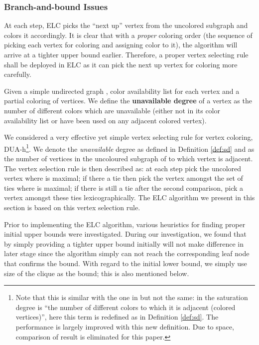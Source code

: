 \documentclass[10pt]{article}
\begin{document}
\subsubsection{Branch-and-bound Issues}

At each step, ELC picks the ``next up'' vertex from the uncolored
subgraph and colors it accordingly.  It is clear that with a \textit{proper}
coloring order (the sequence of picking each vertex for coloring and assigning color to it), the algorithm will arrive at a tighter upper bound earlier.
Therefore, a proper vertex selecting rule shall be deployed in ELC as it can pick the
next up vertex for coloring more carefully.

\begin{mydef}\label{def:sd}
Given a simple undirected graph , color availability list  for each vertex  and  a partial coloring of  vertices. We define the \textbf{unavailable degree} of a vertex as the number of different colors which are unavailable (either not in its color availability list or have been used on any adjacent colored vertex).
\end{mydef}

We considered a very effective yet simple vertex selecting rule for vertex
coloring, DUA-h\footnote{Note that this is similar with the one in \cite{Bre79} but not 
the same: in \cite{Bre79} the saturation degree is ``the number of different 
colors to which it is adjacent (colored vertices)'', here this term is redefined 
as in Definition \ref{def:sd}. The performance is largely improved with this
new definition. Due to space, comparison of result is eliminated for this paper.}.  We
denote  the \emph{unavailable} degree as defined in Definition 
\ref{def:sd} and  as the number of vertices in the uncoloured 
subgraph of  to which vertex  is adjacent. The vertex selection rule is then described as:  at each step pick the uncolored vertex  where  is maximal; 
if there a tie then pick the vertex amongst the set of ties where  is maximal;
if there is still a tie after the second comparison, 
pick a vertex  amongst these ties lexicographically.
The ELC algorithm we present in this section is based on this vertex selection rule.

Prior to implementing the
ELC algorithm, various heuristics for finding proper initial upper
bounds were investigated. During our investigation, we found that by
simply providing a tighter upper bound initially will not make difference 
in later stage since the algorithm simply can not reach the corresponding
leaf node that confirms the bound. With regard to the initial lower bound, we simply
use size of the clique as the bound; this is also mentioned below. 
\end{document}
